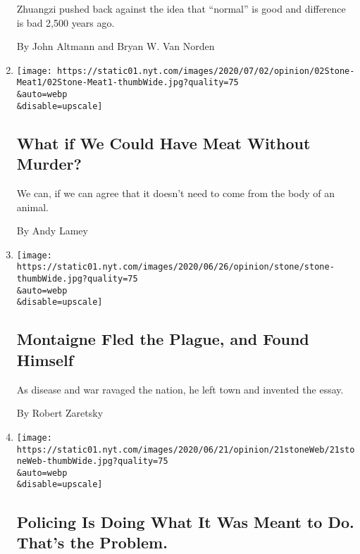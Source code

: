 \begin{enumerate}
  Zhuangzi pushed back against the idea that ``normal'' is good and
  difference is bad 2,500 years ago.

  By John Altmann and Bryan W. Van Norden
\item
  \href{/2020/07/02/opinion/lab-grown-meat.html}{}

  \texttt{[image: https://static01.nyt.com/images/2020/07/02/opinion/02Stone-Meat1/02Stone-Meat1-thumbWide.jpg?quality=75\\\&auto=webp\\\&disable=upscale]}

  \hypertarget{what-if-we-could-have-meat-without-murder}{%
  \subsection{What if We Could Have Meat Without
  Murder?}\label{what-if-we-could-have-meat-without-murder}}

  We can, if we can agree that it doesn't need to come from the body of
  an animal.

  By Andy Lamey
\item
  \href{/2020/06/28/opinion/montaigne-plague-essays.html}{}

  \texttt{[image: https://static01.nyt.com/images/2020/06/26/opinion/stone/stone-thumbWide.jpg?quality=75\\\&auto=webp\\\&disable=upscale]}

  \hypertarget{montaigne-fled-the-plague-and-found-himself}{%
  \subsection{Montaigne Fled the Plague, and Found
  Himself}\label{montaigne-fled-the-plague-and-found-himself}}

  As disease and war ravaged the nation, he left town and invented the
  essay.

  By Robert Zaretsky
\item
  \href{/2020/06/21/opinion/police-violence-racism-reform.html}{}

  \texttt{[image: https://static01.nyt.com/images/2020/06/21/opinion/21stoneWeb/21stoneWeb-thumbWide.jpg?quality=75\\\&auto=webp\\\&disable=upscale]}

  \hypertarget{policing-is-doing-what-it-was-meant-to-do-thats-the-problem}{%
  \subsection{Policing Is Doing What It Was Meant to Do. That's the
  Problem.}\label{policing-is-doing-what-it-was-meant-to-do-thats-the-problem}}


\end{enumerate}

